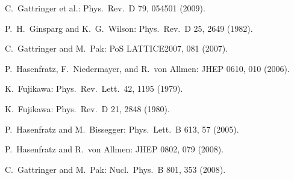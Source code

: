\begin{enumerate}[label={[\arabic*]}]
  \item C.~Gattringer et al.: Phys.\ Rev.\ D 79, 054501 (2009).
  \item P.~H.~Ginsparg and K.~G.~Wilson: Phys.\ Rev.\ D 25, 2649 (1982).
  \item C.~Gattringer and M.~Pak: PoS LATTICE2007, 081 (2007).
  \item P.~Hasenfratz, F.~Niedermayer, and R.~von Allmen: JHEP 0610, 010 (2006).
  \item K.~Fujikawa: Phys.\ Rev.\ Lett.\ 42, 1195 (1979).
  \item K.~Fujikawa: Phys.\ Rev.\ D 21, 2848 (1980).
  \item P.~Hasenfratz and M.~Bissegger: Phys.\ Lett.\ B 613, 57 (2005).
  \item P.~Hasenfratz and R.~von Allmen: JHEP 0802, 079 (2008).
  \item C.~Gattringer and M.~Pak: Nucl.\ Phys.\ B 801, 353 (2008).
\end{enumerate}
